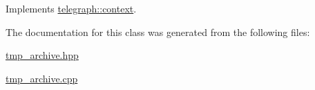 Implements \hyperlink{classtelegraph_1_1context_a1f600d6159df21dd2750b1c706ca3412}{telegraph\+::context}.



The documentation for this class was generated from the following files\+:\begin{DoxyCompactItemize}
\item 
\hyperlink{tmp__archive_8hpp}{tmp\+\_\+archive.\+hpp}\item 
\hyperlink{tmp__archive_8cpp}{tmp\+\_\+archive.\+cpp}\end{DoxyCompactItemize}
